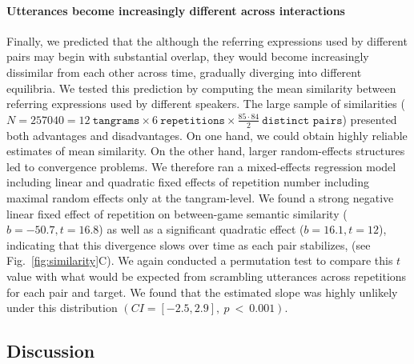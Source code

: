\documentclass[alpha-refs]{wiley-article}
\begin{document}
\paragraph{Utterances become increasingly different across interactions}

Finally, we predicted that the although the referring expressions used by different pairs may begin with substantial overlap, they would become increasingly dissimilar from each other across time, gradually diverging into different equilibria.
We tested this prediction by computing the mean similarity between referring expressions used by different speakers.
The large sample of similarities ($N = 257040 = 12~\texttt{tangrams} \times 6~\texttt{repetitions} \times \frac{85 \cdot 84}{2}~\texttt{distinct pairs}$) presented both advantages and disadvantages.
On one hand, we could obtain highly reliable estimates of mean similarity. 
On the other hand, larger random-effects structures led to convergence problems.
We therefore ran a mixed-effects regression model including linear and quadratic fixed effects of repetition number including maximal random effects only at the tangram-level. 
We found a strong negative linear fixed effect of repetition on between-game semantic similarity ($b = -50.7, t= 16.8$) as well as a significant quadratic effect ($b= 16.1, t = 12$), indicating that this divergence slows over time as each pair stabilizes, (see Fig.~\ref{fig:similarity}C).
We again conducted a permutation test to compare this $t$ value with what would be expected from scrambling utterances across repetitions for each pair and target.
We found that the estimated slope was highly unlikely under this distribution $(CI = [-2.5, 2.9],~p~<~0.001)$. 

\subsection{Discussion}

\end{document}
